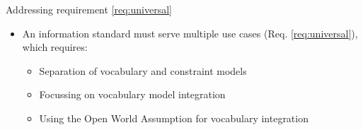 %

\begin{frame}{Addressing requirement \ref{req:universal}}
    \begin{itemize}
        \item An information standard must serve multiple use cases (Req. \ref{req:universal}), which requires:
        \begin{itemize}
            \item Separation of vocabulary and constraint models
            \item Focussing on vocabulary model integration
            \item Using the Open World Assumption for vocabulary integration
        \end{itemize}
    \end{itemize}
\end{frame}
